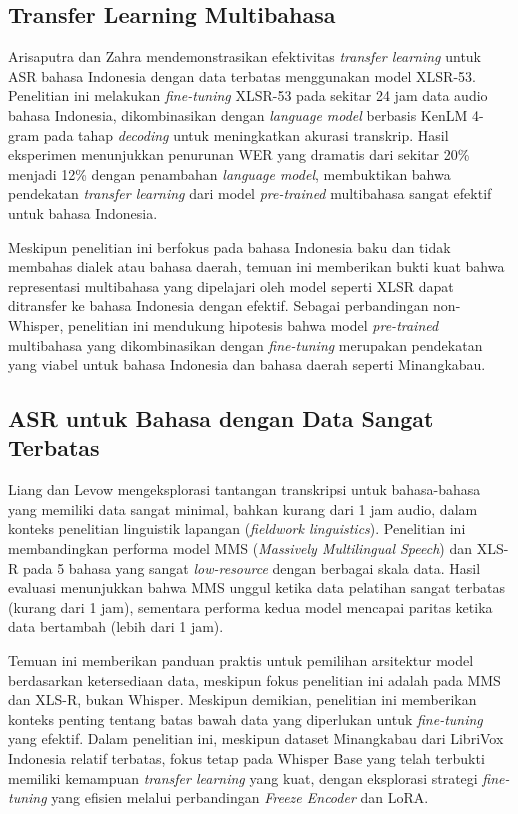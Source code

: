 \subsection{Transfer Learning Multibahasa}

Arisaputra dan Zahra \cite{arisaputra2022xlsr53} mendemonstrasikan efektivitas \textit{transfer learning} untuk ASR bahasa Indonesia dengan data terbatas menggunakan model XLSR-53. Penelitian ini melakukan \textit{fine-tuning} XLSR-53 pada sekitar 24 jam data audio bahasa Indonesia, dikombinasikan dengan \textit{language model} berbasis KenLM 4-gram pada tahap \textit{decoding} untuk meningkatkan akurasi transkrip. Hasil eksperimen menunjukkan penurunan WER yang dramatis dari sekitar 20\% menjadi 12\% dengan penambahan \textit{language model}, membuktikan bahwa pendekatan \textit{transfer learning} dari model \textit{pre-trained} multibahasa sangat efektif untuk bahasa Indonesia.

Meskipun penelitian ini berfokus pada bahasa Indonesia baku dan tidak membahas dialek atau bahasa daerah, temuan ini memberikan bukti kuat bahwa representasi multibahasa yang dipelajari oleh model seperti XLSR dapat ditransfer ke bahasa Indonesia dengan efektif. Sebagai perbandingan non-Whisper, penelitian ini mendukung hipotesis bahwa model \textit{pre-trained} multibahasa yang dikombinasikan dengan \textit{fine-tuning} merupakan pendekatan yang viabel untuk bahasa Indonesia dan bahasa daerah seperti Minangkabau.

\subsection{ASR untuk Bahasa dengan Data Sangat Terbatas}

Liang dan Levow \cite{liang2025fieldmatters} mengeksplorasi tantangan transkripsi untuk bahasa-bahasa yang memiliki data sangat minimal, bahkan kurang dari 1 jam audio, dalam konteks penelitian linguistik lapangan (\textit{fieldwork linguistics}). Penelitian ini membandingkan performa model MMS (\textit{Massively Multilingual Speech}) dan XLS-R pada 5 bahasa yang sangat \textit{low-resource} dengan berbagai skala data. Hasil evaluasi menunjukkan bahwa MMS unggul ketika data pelatihan sangat terbatas (kurang dari 1 jam), sementara performa kedua model mencapai paritas ketika data bertambah (lebih dari 1 jam).

Temuan ini memberikan panduan praktis untuk pemilihan arsitektur model berdasarkan ketersediaan data, meskipun fokus penelitian ini adalah pada MMS dan XLS-R, bukan Whisper. Meskipun demikian, penelitian ini memberikan konteks penting tentang batas bawah data yang diperlukan untuk \textit{fine-tuning} yang efektif. Dalam penelitian ini, meskipun dataset Minangkabau dari LibriVox Indonesia relatif terbatas, fokus tetap pada Whisper Base yang telah terbukti memiliki kemampuan \textit{transfer learning} yang kuat, dengan eksplorasi strategi \textit{fine-tuning} yang efisien melalui perbandingan \textit{Freeze Encoder} dan LoRA.

